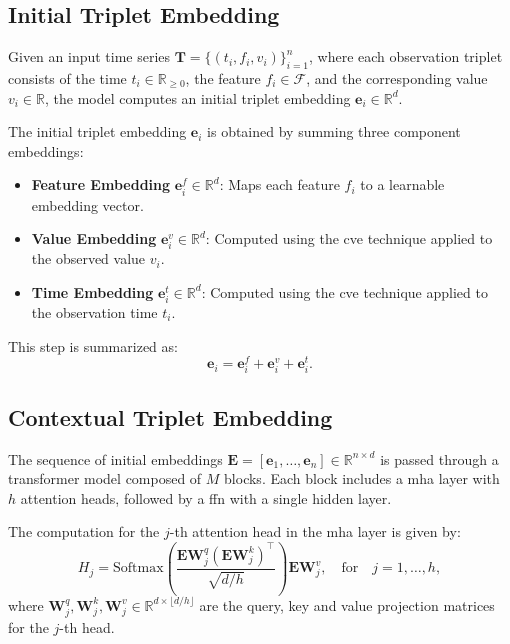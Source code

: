 \subsection{Initial Triplet Embedding}

Given an input time series \( \mathbf{T} = \{(t_i, f_i, v_i)\}_{i=1}^n \), where each observation triplet consists of the time \(t_i \in \mathbb{R}_{\geq 0}\), the feature \(f_i \in \mathcal{F}\), and the corresponding value \(v_i \in \mathbb{R}\), the model computes an initial triplet embedding \(\mathbf{e}_i \in \mathbb{R}^d\).

The initial triplet embedding \(\mathbf{e}_i\) is obtained by summing three component embeddings:

\begin{itemize}
    \item \textbf{Feature Embedding} \(\mathbf{e}_i^f \in \mathbb{R}^d\): Maps each feature \(f_i\) to a learnable embedding vector.
    \item \textbf{Value Embedding} \(\mathbf{e}_i^v \in \mathbb{R}^d\): Computed using the \gls{cve} technique applied to the observed value \(v_i\).
    \item \textbf{Time Embedding} \(\mathbf{e}_i^t \in \mathbb{R}^d\): Computed using the \gls{cve} technique applied to the observation time \(t_i\).
\end{itemize}

This step is summarized as:
\[
\mathbf{e}_i = \mathbf{e}_i^f + \mathbf{e}_i^v + \mathbf{e}_i^t.
\]

\subsection{Contextual Triplet Embedding}

The sequence of initial embeddings \(\mathbf{E} = [\mathbf{e}_1, \ldots, \mathbf{e}_n] \in \mathbb{R}^{n \times d}\) is passed through a transformer model composed of \(M\) blocks. Each block includes a \gls{mha} layer with \(h\) attention heads, followed by a \gls{ffn} with a single hidden layer.

The computation for the \(j\)-th attention head in the \gls{mha} layer is given by:
\[
H_j = \text{Softmax}\left(\frac{\mathbf{E} \mathbf{W}^q_j (\mathbf{E} \mathbf{W}^k_j)^\top}{\sqrt{d / h}}\right) \mathbf{E} \mathbf{W}^v_j, \quad \text{for} \quad j = 1, \ldots, h,
\]
where \(\mathbf{W}^q_j, \mathbf{W}^k_j, \mathbf{W}^v_j \in \mathbb{R}^{d \times \lfloor d / h \rfloor}\) are the query, key and value projection matrices for the \(j\)-th head.

